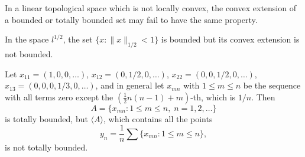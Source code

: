 In a linear topological space which is not locally convex, the convex extension of a bounded or totally bounded set may fail to have the same property.

In the space $l^{1/2}$, the set $\{x: \|x\|_{1/2} < 1\}$ is bounded but its convex extension is not bounded.

Let $x_{11} = (1,0,0,\dots)$, $x_{12} = (0,1/2,0,\dots)$, $x_{22} = (0,0,1/2,0,\dots)$, $x_{13} = (0,0,0,1/3,0,\dots)$, and in general let $x_{mn}$ with $1 \le m \le n$ be the sequence with all terms zero except the $(\frac{1}{2}n(n-1) + m)$-th, which is $1/n$. Then
$$A = \{x_{mn}: 1 \le m \le n,\; n = 1,2,\dots\}$$
is totally bounded, but $\langle A \rangle$, which contains all the points
$$y_n = \frac{1}{n}\sum\{x_{mn}: 1 \le m \le n\},$$
is not totally bounded.
